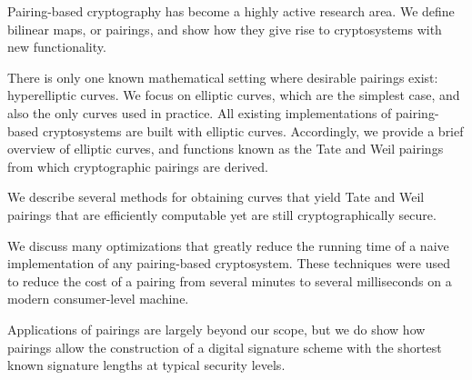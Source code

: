 Pairing-based cryptography has become a highly active research area.
We define bilinear maps, or pairings, and show how they
give rise to cryptosystems with new functionality.

There is only one known mathematical setting where desirable
pairings exist: hyperelliptic curves. We focus on elliptic curves,
which are the simplest case, and also the only curves used in practice.
All existing implementations of pairing-based cryptosystems are built
with elliptic curves. Accordingly,
we provide a brief overview of elliptic curves, and functions known as
the Tate and Weil pairings from which cryptographic pairings are derived.

We describe several methods for obtaining curves that yield Tate and Weil
pairings that are efficiently computable yet are still cryptographically
secure.

We discuss many optimizations that greatly reduce the running time
of a naive implementation of any pairing-based cryptosystem. These
techniques were used to reduce the
cost of a pairing from several minutes
to several milliseconds on a modern consumer-level machine.

Applications of pairings are largely beyond our scope, but we
do show how pairings allow the construction of a digital signature scheme
with the shortest known signature lengths at typical security levels.
